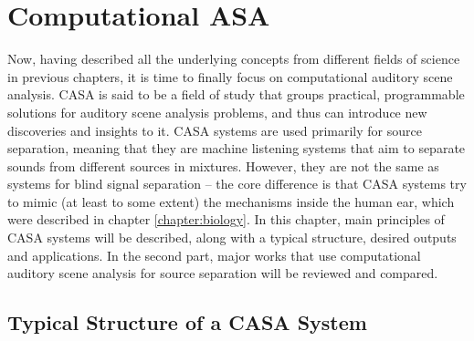 \chapter{Computational ASA}\label{chapter:casa}

Now, having described all the underlying concepts from different fields of science in previous chapters, it is time to finally focus on computational auditory scene analysis. CASA is said to be a field of study that groups practical, programmable solutions for auditory scene analysis problems, and thus can introduce new discoveries and insights to it. CASA systems are used primarily for source separation, meaning that they are machine listening systems that aim to separate sounds from different sources in mixtures. However, they are not the same as systems for blind signal separation – the core difference is that CASA systems try to mimic (at least to some extent) the mechanisms inside the human ear, which were described in chapter \ref{chapter:biology}. In this chapter, main principles of CASA systems will be described, along with a typical structure, desired outputs and applications. In the second part, major works that use computational auditory scene analysis for source separation will be reviewed and compared.

\section{Typical Structure of a CASA System}